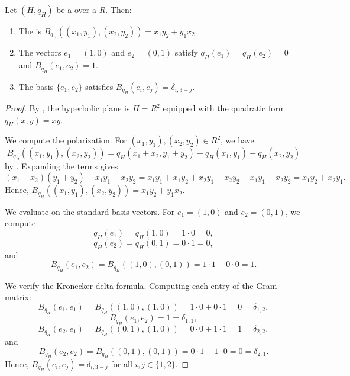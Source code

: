 \begin{lemma} \label{lemma:properties_of_the_hyperbolic_plane_over_a_commutative_ring}
Let $(H, q_H)$ be a  over a  $R$. Then:
    \begin{enumerate}
    \item The  is $B_{q_H}((x_1,y_1),(x_2,y_2)) = x_1 y_2 + y_1 x_2$.
    \item The vectors $e_1 = (1,0)$ and $e_2 = (0,1)$ satisfy $q_H(e_1) = q_H(e_2) = 0$ and $B_{q_H}(e_1,e_2) = 1$.
    \item The basis $\{e_1,e_2\}$ satisfies $B_{q_H}(e_i,e_j) = \delta_{i,3-j}$.
    \end{enumerate}
\end{lemma}
\begin{proof}
    By , the hyperbolic plane is $H = R^2$ equipped with the quadratic form $q_H(x,y) = xy$.

    We compute the polarization. For $(x_1, y_1), (x_2, y_2) \in R^2$, we have
    $$B_{q_H}((x_1, y_1), (x_2, y_2)) = q_H(x_1 + x_2, y_1 + y_2) - q_H(x_1, y_1) - q_H(x_2, y_2)$$
    by . Expanding the terms gives
    $$(x_1 + x_2)(y_1 + y_2) - x_1 y_1 - x_2 y_2 = x_1 y_1 + x_1 y_2 + x_2 y_1 + x_2 y_2 - x_1 y_1 - x_2 y_2 = x_1 y_2 + x_2 y_1.$$
    Hence, $B_{q_H}((x_1, y_1), (x_2, y_2)) = x_1 y_2 + y_1 x_2$.

    We evaluate on the standard basis vectors. For $e_1 = (1, 0)$ and $e_2 = (0, 1)$, we compute
    $$q_H(e_1) = q_H(1, 0) = 1 \cdot 0 = 0,$$
    $$q_H(e_2) = q_H(0, 1) = 0 \cdot 1 = 0,$$
    and
    $$B_{q_H}(e_1, e_2) = B_{q_H}((1, 0), (0, 1)) = 1 \cdot 1 + 0 \cdot 0 = 1.$$

    We verify the Kronecker delta formula. Computing each entry of the Gram matrix:
    $$B_{q_H}(e_1, e_1) = B_{q_H}((1, 0), (1, 0)) = 1 \cdot 0 + 0 \cdot 1 = 0 = \delta_{1,2},$$
    $$B_{q_H}(e_1, e_2) = 1 = \delta_{1,1},$$
    $$B_{q_H}(e_2, e_1) = B_{q_H}((0, 1), (1, 0)) = 0 \cdot 0 + 1 \cdot 1 = 1 = \delta_{2,2},$$
    and
    $$B_{q_H}(e_2, e_2) = B_{q_H}((0, 1), (0, 1)) = 0 \cdot 1 + 1 \cdot 0 = 0 = \delta_{2,1}.$$
    Hence, $B_{q_H}(e_i, e_j) = \delta_{i,3-j}$ for all $i, j \in \{1, 2\}$.
\end{proof}